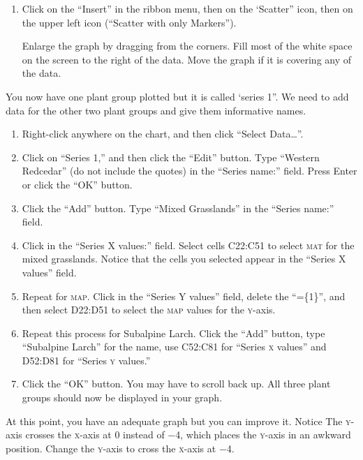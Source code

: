 \documentclass[12pt, hidelinks]{exam}
\newcommand*\axis[1]{{\scshape #1}-axis}
\begin{document}
\begin{questions}
\begin{enumerate}
	\item Click on the “Insert” in the ribbon menu, then on the ‘Scatter” icon, then on the upper left icon (“Scatter with only Markers”).

	Enlarge the graph by dragging from the corners. Fill most of the white space on the screen to the right of the data. Move the graph if it is covering any of the data. 
\end{enumerate}

You now have one plant group plotted but it is called ‘series 1”. We need to add data for the other two plant groups and give them informative names. 

\begin{enumerate}[resume]
	\item Right-click anywhere on the chart, and then click “Select Data\dots”.

	\item Click on “Series 1,” and then click the “Edit” button. Type “Western Redcedar” (do not include the quotes) in the “Series name:” field. Press Enter or click the “OK” button.

	\item Click the “Add” button. Type “Mixed Grasslands” in the “Series name:” field.

	\item Click in the “Series X values:” field. Select cells {\liningnum C22:C51} to select \textsc{mat} for the mixed grasslands. Notice that the cells you selected appear in the “Series X values” field.

	\item Repeat for \textsc{map}. Click in the “Series Y values” field, delete the “=\{1\}”, and then select {\liningnum D22:D51} to select the \textsc{map} values for the \axis{y}. 

	\item Repeat this process for Subalpine Larch. Click the “Add” button, type “Subalpine Larch” for the name, use {\liningnum C52:C81} for “Series \textsc{x} values” and {\liningnum D52:D81} for “Series \textsc{y} values.” 

	\item Click the “OK” button. You may have to scroll back up. All three plant groups should now be displayed in your graph. 
\end{enumerate}

At this point, you have an adequate graph but you can improve it. Notice The \axis{y} crosses the \axis{x} at 0 instead of $-$4, which places the \axis{y} in an awkward position. Change the \axis{y} to cross the \axis{x} at $-$4.


\end{questions}
\end{document}
